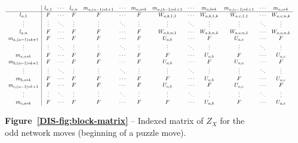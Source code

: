 \begin{figure}[H]
	\centering
	\small
	\begin{adjustwidth}{\extralength}{\extralength}
		\setlength{\arraycolsep}{3pt}%
		\renewcommand{\arraystretch}{1.05}%
		\[
		\resizebox{1\linewidth}{!}{$
			\begin{array}{c|cccccccccccc}
				& l_{a,1} & \cdots & l_{a,n} & m_{a,(a-1)*k + 1} & \cdots & m_{a,a * k} & m_{a,(b-1)*k + 1} & \cdots & m_{a,b*k} & m_{a,(c-1)*k + 1} & \cdots & m_{a,c*k} \\ \hline
				l_{a,1} & F & \cdots & F & F & \cdots & F & W_{a,b,1, 1} & \cdots & W_{a,b,1, k} & W_{a,c,1, 1} & \cdots & W_{a,c,n, k} \\
				\vdots &  \vdots & \ddots &  \vdots &  \vdots & \ddots &  \vdots &  \vdots & \ddots &  \vdots &  \vdots & \ddots &  \vdots \\
				l_{a,n} & F & \cdots & F & F & \cdots & F & W_{a,b,n, 1} & \cdots & W_{a,b,n, k} & W_{a,c,n, 1} & \cdots & W_{a,c,n, k} \\
				m_{a,(a-1)*k + 1} & F & \cdots & F & F & \cdots & F & U_{a,b} & \cdots & F & U_{a,c} & \cdots & F \\
				\vdots & \vdots & \ddots & \vdots & \vdots & \ddots & \vdots & \vdots & \ddots & \vdots & \vdots & \ddots & \vdots \\
				m_{a,a*k} & F & \cdots & F & F & \cdots & F & F & \cdots & U_{a,b} & F & \cdots & U_{a,c} \\
				m_{b,(a-1)*k + 1} & F & \cdots & F & F & \cdots & F & U_{a,b} & \cdots & F & U_{a,c} & \cdots & F \\
				\vdots & \vdots & \ddots & \vdots & \vdots & \ddots & \vdots & \vdots & \ddots & \vdots & \vdots & \ddots & \vdots \\
				m_{b,a*k} & F & \cdots & F & F & \cdots & F & F & \cdots & U_{a,b} & F & \cdots & U_{a,c} \\
				m_{c,(a-1)*k + 1} & F & \cdots & F & F & \cdots & F & U_{a,b} & \cdots & F & U_{a,c} & \cdots & F \\
				\vdots & \vdots & \ddots & \vdots & \vdots & \ddots & \vdots & \vdots & \ddots & \vdots & \vdots & \ddots & \vdots \\
				m_{c,a*k} & F & \cdots & F & F & \cdots & F & F & \cdots & U_{a,b} & F & \cdots & U_{a,c}
			\end{array}
			$}
		\]
	\end{adjustwidth}
	\caption*{\textbf{Figure~\ref{DIS-fig:block-matrix}} -- Indexed matrix of $Z_X$ for the odd network moves (beginning of a puzzle move).}
\end{figure}


